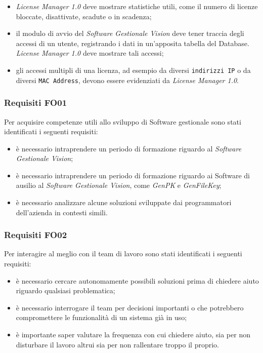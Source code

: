 \begin{itemize}

\item \textit{License Manager 1.0} deve mostrare statistiche utili, come il numero di licenze bloccate, disattivate, scadute o in scadenza;
\item il modulo di avvio del \textit{Software Gestionale Vision} deve tener traccia degli accessi di un utente, registrando i dati in un'apposita tabella del Database. \textit{License Manager 1.0} deve mostrare tali accessi;
\item gli accessi multipli di una licenza, ad esempio da diversi \texttt{indirizzi IP} o da diversi \texttt{MAC Address}, devono essere evidenziati da \textit{License Manager 1.0}.

\end{itemize}
\subsubsection{Requisiti FO01}

Per acquisire competenze utili allo sviluppo di Software gestionale sono stati identificati i seguenti requisiti:

\begin{itemize}
\item è necessario intraprendere un periodo di formazione riguardo al \textit{Software Gestionale Vision};
\item è necessario intraprendere un periodo di formazione riguardo ai Software di ausilio al \textit{Software Gestionale Vision}, come \textit{GenPK} e \textit{GenFileKey};
\item è necessario analizzare alcune soluzioni sviluppate dai programmatori dell'azienda in contesti simili.
\end{itemize}

\subsubsection{Requisiti FO02}

Per interagire al meglio con il team di lavoro sono stati identificati i seguenti requisiti:

\begin{itemize}
\item è necessario cercare autonomamente possibili soluzioni prima di chiedere aiuto riguardo qualsiasi problematica;
\item è necessario interrogare il team per decisioni importanti o che potrebbero compromettere le funzionalità di un sistema già in uso;
\item è importante saper valutare la frequenza con cui chiedere aiuto, sia per non disturbare il lavoro altrui sia per non rallentare troppo il proprio.
\end{itemize}

